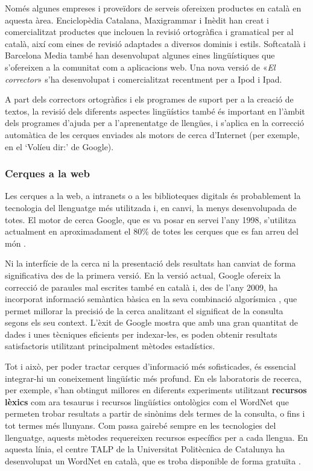 \begin{multicols}{2}

Només algunes empreses i proveïdors de serveis ofereixen productes en català en aquesta àrea. Enciclopèdia Catalana, Maxigrammar i Inèdit han creat i comercialitzat productes que inclouen la revisió ortogràfica i gramatical per al català, així com eines de revisió adaptades a diversos dominis i estils. Softcatalà i Barcelona Media també han desenvolupat algunes eines lingüístiques que s’ofereixen a la comunitat com a aplicacions web. Una nova versió de «\textit{El corrector}» s’ha desenvolupat i comercialitzat recentment per a Ipod i Ipad. 

A part dels correctors ortogràfics i els programes de suport per a la creació de textos, la revisió dels diferents aspectes lingüístics també és important en l’àmbit dels programes d’ajuda per a l’aprenentatge de llengües, i s’aplica en la correcció automàtica de les cerques enviades als motors de cerca d’Internet (per exemple, en el ‘Volíeu dir:’ de Google). 

\subsubsection{Cerques a la web}

Les cerques a la web, a intranets o a les biblioteques digitals és probablement la tecnologia del llenguatge més utilitzada i, en canvi, la menys desenvolupada de totes. El motor de cerca Google, que es va posar en servei l’any 1998, s’utilitza actualment en aproximadament el 80\% de totes les cerques que es fan arreu del món \cite{CAT-Nota22}. 

Ni la interfície de la cerca ni la presentació dels resultats han canviat de forma significativa des de la primera versió. En la versió actual, Google ofereix la correcció de paraules mal escrites també en català i, des de l’any 2009, ha incorporat informació semàntica bàsica en la seva combinació algorísmica \cite{CAT-Nota23}, que permet millorar la precisió de la cerca analitzant el significat de la consulta segons els seu context. L’èxit de Google mostra que amb una gran quantitat de dades i unes tècniques eficients per indexar-les, es poden obtenir resultats satisfactoris utilitzant principalment mètodes estadístics.

Tot i això, per poder tractar cerques d’informació més sofisticades, és essencial integrar-hi un coneixement lingüístic més profund. En els laboratoris de recerca, per exemple, s’han obtingut millores en diferents experiments utilitzant \textbf{recursos lèxics} com ara tesaurus i recursos lingüístics ontològics com el WordNet que permeten trobar resultats a partir de sinònims dels termes de la consulta, o fins i tot termes més llunyans. Com passa gairebé sempre en les tecnologies del llenguatge, aquests mètodes requereixen recursos específics per a cada llengua. En aquesta línia, el centre TALP de la Universitat Politècnica de Catalunya ha desenvolupat un WordNet en català, que es troba disponible de forma gratuïta \cite{CAT-Nota24}. 


\end{multicols}
